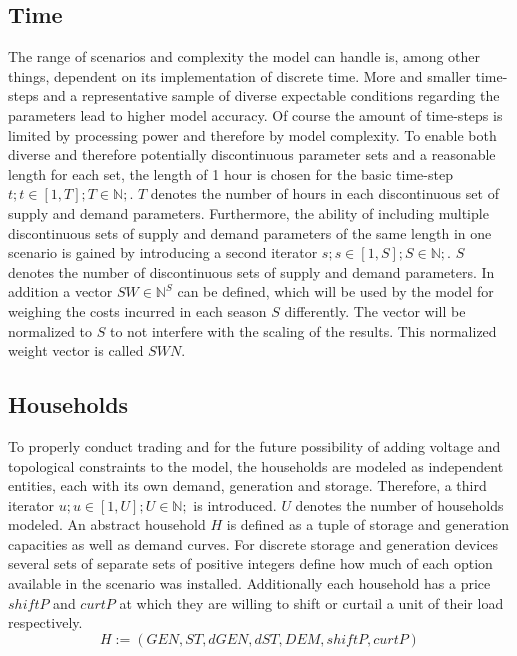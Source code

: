 \documentclass[
	11pt,								%
	DIV10,								%
	a4paper,         					%
	oneside,							%
	headheight=20pt,					%
	footheight=20pt,					%
    parskip=full,						%
    listof=totoc,						%
	bibliography=totoc,					%
	index=totoc,						%
]{scrartcl}
\begin{document}
\subsection{Time}
The range of scenarios and complexity the model can handle is, among other things, dependent on its implementation of discrete time. More and smaller time-steps and a representative sample of diverse expectable conditions regarding the parameters lead to higher model accuracy. Of course the amount of time-steps is limited by processing power and therefore by model complexity. To enable both diverse and therefore potentially discontinuous parameter sets and a reasonable length for each set, the length of 1 hour is chosen for the basic time-step 
$t; t \in [1,T]; T \in \mathbb{N} ;$. $T$ denotes the number of hours in each discontinuous set of supply and demand parameters.
Furthermore, the ability of including multiple discontinuous sets of supply and demand parameters of the same length in one scenario is gained by introducing a second iterator 
$s; s \in [1,S]; S \in \mathbb{N} ;$. $S$ denotes the number of discontinuous sets of supply and demand parameters. In addition a vector $SW \in \mathbb{N}^S$ can be defined, which will be used by the model for weighing the costs incurred in each season $S$ differently. The vector will be normalized to $S$ to not interfere with the scaling of the results. This normalized weight vector is called $SWN$.




\subsection{Households}
To properly conduct trading and for the future possibility of adding voltage and topological constraints to the model, the households are modeled as independent entities, each with its own demand, generation and storage. Therefore, a third iterator $u; u \in [1,U]; U \in \mathbb{N};$ is introduced. $U$ denotes the number of households modeled.
An abstract household $H$ is defined as a tuple of storage and generation capacities as well as demand curves. For discrete storage and generation devices several sets of separate sets of positive integers define how much of each option available in the scenario was installed. Additionally each household has a price $shiftP$ and $curtP$ at which they are willing to shift or curtail a unit  of their load respectively.
\begin{equation}
	H := (GEN, ST, dGEN, dST, DEM, shiftP, curtP)
\end{equation}
\end{document}
